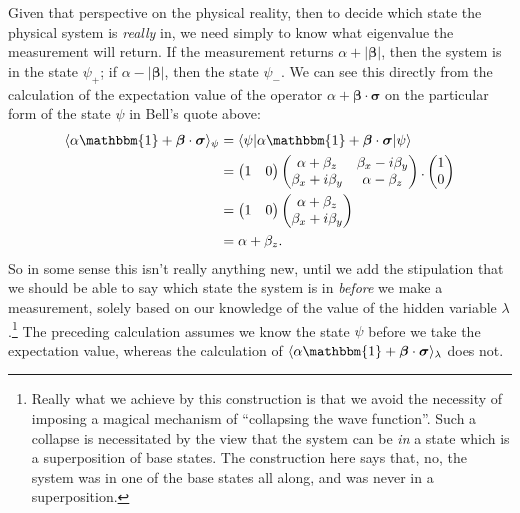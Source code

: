 \documentclass[12pt]{article}
\begin{document}
Given that perspective on the physical reality, then to decide which state the physical system is \emph{really} in, we need simply to know what eigenvalue the measurement will return. If the measurement returns $\alpha + |\bm{\beta}|$, then the system is in the state $\psi_{+}$; if $\alpha - |\bm{\beta}|$, then the state $\psi_{-}$. We can see this directly from the calculation of the expectation value of the operator $\alpha + \bm{\beta} \cdot \bm{\sigma}$ on the particular form of the state $\psi$ in Bell's quote above:
\begin{displaymath}
  \begin{split}
    \langle \alpha \mathbbm{1} + \bm{\beta} \cdot \bm{\sigma} \rangle_{\psi}
    &= \langle \psi | \alpha \mathbbm{1} + \bm{\beta} \cdot \bm{\sigma} | \psi \rangle \\
    &=
    \begin{pmatrix}
      1 & 0
    \end{pmatrix}
    \begin{pmatrix}
      \alpha + \beta_z & \beta_x - i \beta_y \\
      \beta_x + i \beta_y & \alpha - \beta_z
    \end{pmatrix}.
    \begin{pmatrix}
      1 \\
      0
    \end{pmatrix}
    \\
    &=
    \begin{pmatrix}
      1 & 0
    \end{pmatrix}
    \begin{pmatrix}
      \alpha + \beta_z \\
      \beta_x + i\beta_y
    \end{pmatrix}
    \\
    &= \alpha + \beta_z.
  \end{split}
\end{displaymath}
So in some sense this isn't really anything new, until we add the stipulation that we should be able to say which state the system is in \emph{before} we make a measurement, solely based on our knowledge of the value of the hidden variable $\lambda$.\footnote{Really what we achieve by this construction is that we avoid the necessity of imposing a magical mechanism of ``collapsing the wave function''. Such a collapse is necessitated by the view that the system can be \emph{in} a state which is a superposition of base states. The construction here says that, no, the system was in one of the base states all along, and was never in a superposition.} The preceding calculation assumes we know the state $\psi$ before we take the expectation value, whereas the calculation of $\langle \alpha \mathbbm{1} + \bm{\beta} \cdot \bm{\sigma} \rangle_{\lambda}$ does not.
\end{document}
